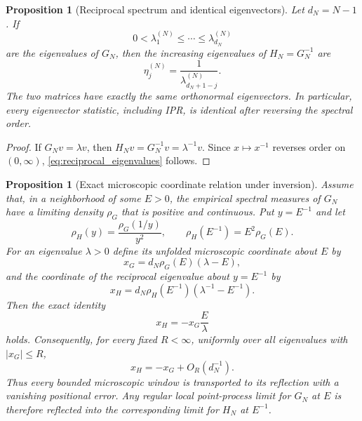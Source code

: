 \documentclass[11pt]{amsart}
\numberwithin{equation}{section}
\theoremstyle{plain}
\newtheorem{proposition}[theorem]{Proposition}
\theoremstyle{definition}
\theoremstyle{remark}
\begin{document}
\begin{proposition}[Reciprocal spectrum and identical eigenvectors]
\label{prop:reciprocal_spectrum}
Let $d_N=N-1$.  If
\begin{equation}
0<\lambda_1^{(N)}\le\cdots\le\lambda_{d_N}^{(N)}
\end{equation}
are the eigenvalues of $G_N$, then the increasing eigenvalues of $H_N=G_N^{-1}$ are
\begin{equation}
\eta_j^{(N)}=\frac{1}{\lambda_{d_N+1-j}^{(N)}}.
\label{eq:reciprocal_eigenvalues}
\end{equation}
The two matrices have exactly the same orthonormal eigenvectors.  In particular, every eigenvector statistic, including IPR, is identical after reversing the spectral order.
\end{proposition}

\begin{proof}
If $G_Nv=\lambda v$, then $H_Nv=G_N^{-1}v=\lambda^{-1}v$.  Since $x\mapsto x^{-1}$ reverses order on $(0,\infty)$, \eqref{eq:reciprocal_eigenvalues} follows.
\end{proof}

\begin{proposition}[Exact microscopic coordinate relation under inversion]
\label{prop:local_inversion_equivalence}
Assume that, in a neighborhood of some $E>0$, the empirical spectral measures of $G_N$ have a limiting density $\rho_G$ that is positive and continuous.  Put $y=E^{-1}$ and let
\begin{equation}
\rho_H(y)=\frac{\rho_G(1/y)}{y^2},
\qquad
\rho_H(E^{-1})=E^2\rho_G(E).
\label{eq:pushforward_density}
\end{equation}
For an eigenvalue $\lambda>0$ define its unfolded microscopic coordinate about $E$ by
\begin{equation}
x_G=d_N\rho_G(E)(\lambda-E),
\end{equation}
and the coordinate of the reciprocal eigenvalue about $y=E^{-1}$ by
\begin{equation}
x_H=d_N\rho_H(E^{-1})(\lambda^{-1}-E^{-1}).
\end{equation}
Then the exact identity
\begin{equation}
x_H=-x_G\frac{E}{\lambda}
\label{eq:exact_local_inversion_coordinate}
\end{equation}
holds.  Consequently, for every fixed $R<\infty$, uniformly over all eigenvalues with $|x_G|\le R$,
\begin{equation}
x_H=-x_G+O_R(d_N^{-1}).
\label{eq:uniform_local_inversion}
\end{equation}
Thus every bounded microscopic window is transported to its reflection with a vanishing positional error.  Any regular local point-process limit for $G_N$ at $E$ is therefore reflected into the corresponding limit for $H_N$ at $E^{-1}$.
\end{proposition}
\end{document}
